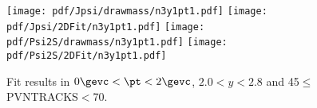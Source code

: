\begin{figure}[H]
\begin{center}
\texttt{[image: pdf/Jpsi/drawmass/n3y1pt1.pdf]}
\texttt{[image: pdf/Jpsi/2DFit/n3y1pt1.pdf]}
\vspace*{-0.5cm}
\texttt{[image: pdf/Psi2S/drawmass/n3y1pt1.pdf]}
\texttt{[image: pdf/Psi2S/2DFit/n3y1pt1.pdf]}
\vspace*{-0.5cm}
\end{center}
\caption{Fit results in $0\gevc<\pt<2\gevc$, $2.0<y<2.8$ and 45$\leq$PVNTRACKS$<$70.}
\label{Fitn3y1pt1}
\end{figure}
